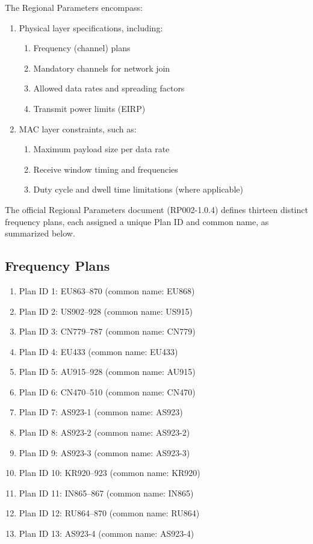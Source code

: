 The Regional Parameters encompass:
\begin{enumerate}
    \item Physical layer specifications, including:
          \begin{enumerate}
              \item Frequency (channel) plans
              \item Mandatory channels for network join
              \item Allowed data rates and spreading factors
              \item Transmit power limits (EIRP)
          \end{enumerate}
    \item MAC layer constraints, such as:
          \begin{enumerate}
              \item Maximum payload size per data rate
              \item Receive window timing and frequencies
              \item Duty cycle and dwell time limitations (where applicable)
          \end{enumerate}
\end{enumerate}

The official Regional Parameters document (RP002-1.0.4) defines thirteen distinct frequency plans, each assigned a unique Plan ID and common name, as summarized below.

\subsection{Frequency Plans}

\begin{enumerate}
    \item Plan ID 1: EU863–870 (common name: EU868)
    \item Plan ID 2: US902–928 (common name: US915)
    \item Plan ID 3: CN779–787 (common name: CN779)
    \item Plan ID 4: EU433 (common name: EU433)
    \item Plan ID 5: AU915–928 (common name: AU915)
    \item Plan ID 6: CN470–510 (common name: CN470)
    \item Plan ID 7: AS923-1 (common name: AS923)
    \item Plan ID 8: AS923-2 (common name: AS923-2)
    \item Plan ID 9: AS923-3 (common name: AS923-3)
    \item Plan ID 10: KR920–923 (common name: KR920)
    \item Plan ID 11: IN865–867 (common name: IN865)
    \item Plan ID 12: RU864–870 (common name: RU864)
    \item Plan ID 13: AS923-4 (common name: AS923-4)
\end{enumerate}

